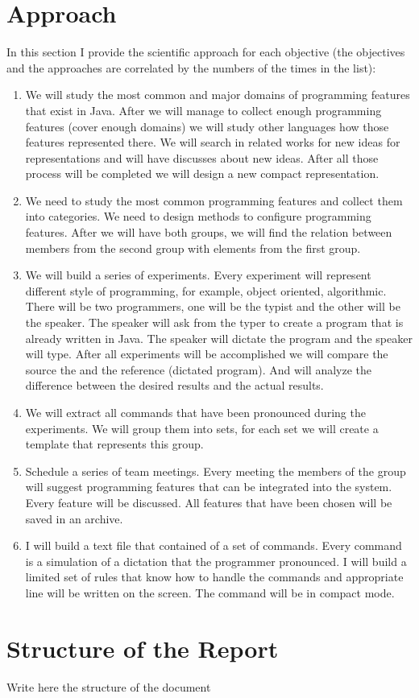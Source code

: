 \section{Approach}
In this section I provide the scientific approach for each objective (the objectives and the approaches are correlated by the numbers of the times in the list):
\begin{enumerate}
	\item We will study the most common and major domains of programming features that exist in Java. After we will manage to collect enough programming features (cover enough domains) we will study other languages how those features represented there. We will search in related works for new ideas for representations and will have discusses about new ideas. After all those process will be completed we will design a new compact representation.
	\item We need to study the most common programming features and collect them into categories. We need to design methods to configure programming features. After we will have both groups, we will find the relation between members from the second group with elements from the first group.
	\item We will build a series of experiments. Every experiment will represent different style of programming, for example, object oriented, algorithmic. There will be two programmers, one will be the typist and the other will be the speaker. The speaker will ask from the typer to create a program that is already written in Java. The speaker will dictate the program and the speaker will type. After all experiments will be accomplished we will compare the source the and the reference (dictated program). And will analyze the difference between the desired results and the actual results.
	\item We will extract all commands that have been pronounced during the experiments. We will group them into sets, for each set we will create a template that represents this group.
	\item Schedule a series of team meetings. Every meeting the members of the group will suggest programming features that can be integrated into the system. Every feature will be discussed. All features that have been chosen will be saved in an archive.
	\item I will build a text file that contained of a set of commands. Every command is a simulation of a dictation that the programmer pronounced. I will build a limited set of rules that know how to handle the commands and appropriate line will be written on the screen. The command will be in compact mode.
\end{enumerate}

\section{Structure of the Report}
\begin{remark}
Write here the structure of the document
\end{remark}